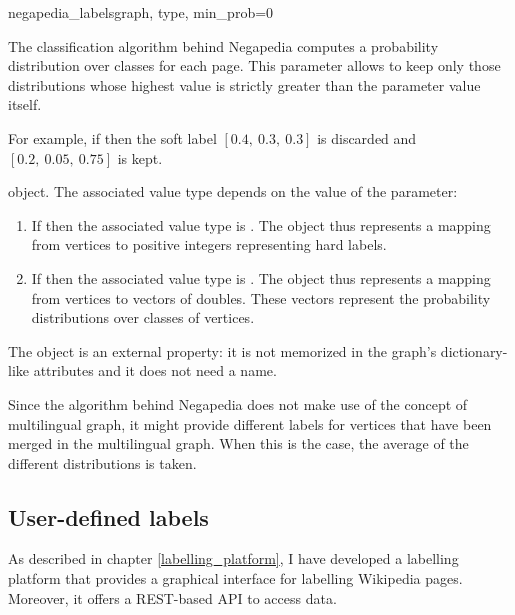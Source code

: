 \begin{independentfunctiondoc}{negapedia\_labels}{graph, type, min\_prob=0}
\begin{functionparameters}
                    The classification algorithm behind Negapedia computes a probability distribution over classes for each page. This parameter allows to keep only those distributions whose highest value is strictly greater than the parameter value itself.
                    
                    For example, if  then the soft label \(\left[0.4,\ 0.3,\ 0.3\right]\) is discarded and \(\left[0.2,\ 0.05,\ 0.75\right]\) is kept.
                \end{functionparameters}
                
                \begin{functionoutput}
                     object. The associated value type depends on the value of the  \normalfont parameter:
                    \begin{enumerate}
                        \item If  then the associated value type is .  The object thus represents a mapping from vertices to positive integers representing hard labels.
                        \item If  then the associated value type is . The object thus represents a mapping from vertices to vectors of doubles. These vectors represent the probability distributions over classes of vertices.
                    \end{enumerate}
                    
                    The object is an external property: it is not memorized in the graph's dictionary-like attributes and it does not need a name.
                \end{functionoutput}
            \end{independentfunctiondoc}
            Since the algorithm behind Negapedia does not make use of the concept of multilingual graph, it might provide different labels for vertices that have been merged in the multilingual graph. When this is the case, the average of the different distributions is taken.
        \subsection{User-defined labels}
            As described in chapter \ref{labelling_platform}, I have developed a labelling platform that provides a graphical interface for labelling Wikipedia pages. Moreover, it offers a REST-based API to access data.
            
